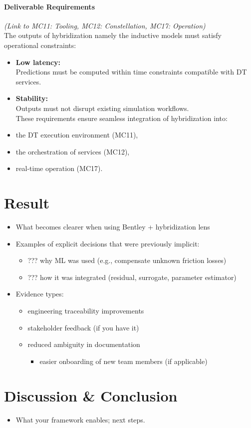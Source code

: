 \documentclass[
]{article}
\providecommand{\tightlist}{%
  \setlength{\itemsep}{0pt}\setlength{\parskip}{0pt}}
\begin{document}
\paragraph{Deliverable Requirements}\label{deliverable-requirements}

\emph{(Link to MC11: Tooling, MC12: Constellation, MC17: Operation)}\\
The outputs of hybridization namely the inductive models must satisfy
operational constraints:

\begin{itemize}
\tightlist
\item
  \textbf{Low latency:}\\
  Predictions must be computed within time constraints compatible with
  DT services.
\item
  \textbf{Stability:}\\
  Outputs must not disrupt existing simulation workflows.\\
  These requirements ensure seamless integration of hybridization into:
\item
  the DT execution environment (MC11),
\item
  the orchestration of services (MC12),
\item
  real-time operation (MC17).
\end{itemize}

\section{Result}\label{result}

\begin{itemize}
\tightlist
\item
  What becomes clearer when using Bentley + hybridization lens
\item
  Examples of explicit decisions that were previously implicit:

  \begin{itemize}
  \tightlist
  \item
    ??? why ML was used (e.g., compensate unknown friction losses)
  \item
    ??? how it was integrated (residual, surrogate, parameter estimator)
  \end{itemize}
\item
  Evidence types:

  \begin{itemize}
  \tightlist
  \item
    engineering traceability improvements
  \item
    stakeholder feedback (if you have it)
  \item
    reduced ambiguity in documentation

    \begin{itemize}
    \tightlist
    \item
      easier onboarding of new team members (if applicable)
    \end{itemize}
  \end{itemize}
\end{itemize}

\section{Discussion \& Conclusion}\label{discussion-conclusion}

\begin{itemize}
\tightlist
\item
  What your framework enables; next steps.
\end{itemize}
\end{document}
